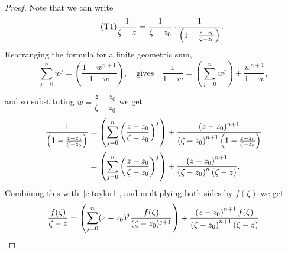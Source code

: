 \begin{proof}
Note that we can write
\begin{equation}
\label{e:taylor1}\tag{T1}
\frac{1}{\zeta-z} = \frac{1}{\zeta-z_0}\cdot \frac{1}{\left( 1-\frac{z-z_0}{\zeta-z_0} \right)}.
\end{equation}
Rearranging the formula for a finite geometric sum,
\[
\sum_{j=0}^n w^j = \left( \frac{1-w^{n+1}}{1-w} \right),\quad\text{gives}\quad \frac{1}{1-w} = \left( \sum_{j=0}^n w^j \right) + \frac{w^{n+1}}{1-w},
\]

and so substituting $w = \dfrac{z-z_0}{\zeta-z_0}$ we get
\begin{align*}
\frac{1}{\left( 1-\frac{z-z_0}{\zeta-z_0} \right)} & = \left(\sum_{j=0}^n \left(\frac{z-z_0}{\zeta-z_0}\right)^j \right) + \frac{(z-z_0)^{n+1}}{\left( \zeta-z_0 \right)^{n+1}\left( 1-\frac{z-z_0}{\zeta-z_0} \right)} \\
& = \left(\sum_{j=0}^n \left(\frac{z-z_0}{\zeta-z_0}\right)^j \right) + \frac{\left( z-z_0 \right)^{n+1}}{\left( \zeta-z_0 \right)^n \left( \zeta-z \right)}.
\end{align*}
Combining this with~\eqref{e:taylor1}, and multiplying both sides by $f(\zeta)$ we get
\[
\frac{f(\zeta)}{\zeta-z} = \left( \sum_{j=0}^n (z-z_0)^j \frac{f(\zeta)}{(\zeta-z_0)^{j+1}} \right) + \frac{\left( z-z_0 \right)^{n+1}f(\zeta)}{\left( \zeta-z_0 \right)^{n+1} \left( \zeta-z \right)}
\]
\end{proof}

